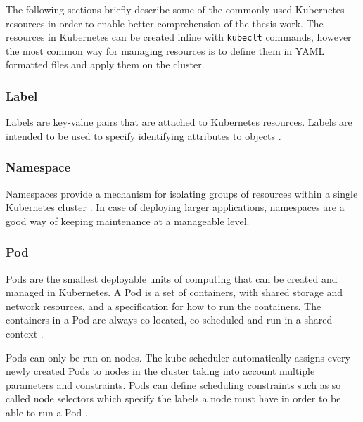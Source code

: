 The following sections briefly describe some of the commonly used Kubernetes resources in order to enable better comprehension of the thesis work. The resources in Kubernetes can be created inline with \texttt{kubeclt} commands, however the most common way for managing resources is to define them in YAML formatted files and apply them on the cluster.

\subsubsection{Label}

Labels are key-value pairs that are attached to Kubernetes resources. Labels are intended to be used to specify identifying attributes to objects \cite{KubernetesLabel}.

\subsubsection{Namespace}

Namespaces provide a mechanism for isolating groups of resources within a single Kubernetes cluster \cite{KubernetesNamespace}. In case of deploying larger applications, namespaces are a good way of keeping maintenance at a manageable level.

\subsubsection{Pod} \label{k8s-pod}

Pods are the smallest deployable units of computing that can be created and managed in Kubernetes. A Pod is a set of containers, with shared storage and network resources, and a specification for how to run the containers. The containers in a Pod are always co-located, co-scheduled and run in a shared context \cite{KubernetesPod}.

Pods can only be run on nodes. The kube-scheduler automatically assigns every newly created Pods to nodes in the cluster taking into account multiple parameters and constraints. Pods can define scheduling constraints such as so called node selectors which specify the labels a node must have in order to be able to run a Pod \cite{KubernetesNodeSelector}.

